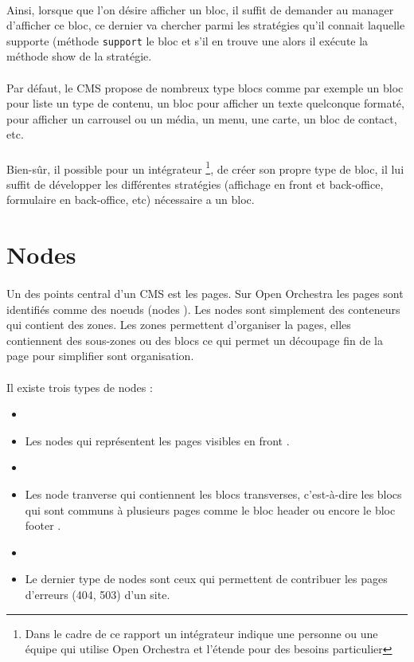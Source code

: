          \paragraph{}
	       Ainsi, lorsque que l'on désire afficher un bloc, il suffit de demander au manager d'afficher ce bloc, ce dernier va chercher parmi les stratégies qu'il connait laquelle supporte (méthode \verb?support? le bloc et s'il en trouve une alors il exécute la méthode show de la stratégie.
	        
	      	\paragraph{}
	      	Par défaut, le CMS propose de nombreux type blocs  comme par exemple un bloc pour liste un type de contenu, un bloc pour afficher un texte quelconque formaté, pour afficher un carrousel ou un média, un menu, une carte, un bloc de contact, etc.
	      \paragraph{}
	      	 Bien-sûr, il possible pour un intégrateur \footnote{Dans le cadre de ce rapport un intégrateur indique une personne ou une équipe qui utilise Open Orchestra et l'étende pour des besoins particulier}, de créer son propre type de bloc, il lui suffit de développer les différentes stratégies (affichage en front et back-office, formulaire en back-office, etc) nécessaire a un bloc.  
         \section{Nodes}
         \paragraph{}
         Un des points central d'un CMS est les pages. Sur Open Orchestra les pages sont identifiés comme des noeuds (\og nodes \fg{}).
          Les nodes sont simplement des conteneurs qui contient des zones. Les zones permettent d'organiser la pages, elles contiennent des sous-zones ou des blocs ce qui permet un découpage fin de la page pour simplifier sont organisation. 
         \paragraph{}
         Il existe trois types de nodes : 
         \begin{itemize}
         \item[]
         \item  Les nodes qui représentent les pages visibles en \og front \fg{}.
          \item[]
         \item  Les \og node tranverse \fg{} qui contiennent les blocs transverses, c'est-à-dire les blocs qui sont communs à plusieurs pages comme le bloc \og header \fg{} ou encore le bloc \og footer \fg{}.
          \item[]
         \item Le dernier type de nodes sont ceux qui permettent de contribuer les pages d'erreurs (404, 503) d'un site.
         \end{itemize}
